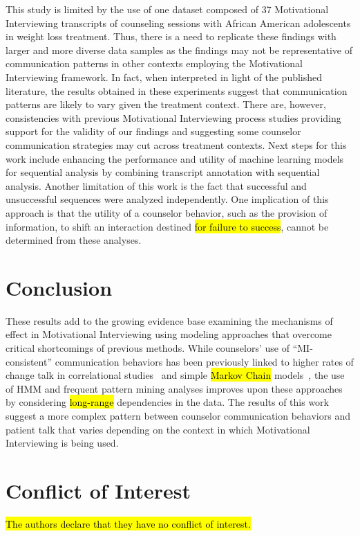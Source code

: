 \documentclass[smallextended]{svjour3}       %
\begin{document}
This study is limited by the use of one dataset composed of 37 Motivational Interviewing transcripts of counseling sessions with African American adolescents in weight loss treatment. Thus, there is a need to replicate these findings with larger and more diverse data samples as the findings may not be representative of communication patterns in other contexts employing the Motivational Interviewing framework. In fact, when interpreted in light of the published literature, the results obtained in these experiments suggest that communication patterns are likely to vary given the treatment context. There are, however, consistencies with previous Motivational Interviewing process studies providing support for the validity of our findings and suggesting some counselor communication strategies may cut across treatment contexts. Next steps for this work include enhancing the performance and utility of machine learning models for sequential analysis by combining transcript annotation with sequential analysis. Another limitation of this work is the fact that successful and unsuccessful sequences were analyzed independently. One implication of this approach is that the utility of a counselor behavior, such as the provision of information, to shift an interaction destined \hl{for failure to success}, cannot be determined from these analyses.

\section{Conclusion}
\label{sec:conclusion}
These results add to the growing evidence base examining the mechanisms of effect in Motivational Interviewing using modeling approaches that overcome critical shortcomings of previous methods. While counselors' use of ``MI-consistent'' communication behaviors has been previously linked to higher rates of change talk in correlational studies~\cite{moyers2006therapist, catley2006adherence, thrasher2006motivational, mccambridge2011fidelity} and simple \hl{Markov Chain} models~\cite{moyers2006therapist, moyers2009session, gaume2010counselor}, the use of HMM and frequent pattern mining analyses improves upon these approaches by considering \hl{long-range} dependencies in the data. The results of this work suggest a more complex pattern between counselor communication behaviors and patient talk that varies depending on the context in which Motivational Interviewing is being used.  

\section{Conflict of Interest}
\label{sec:conflictofInterest}
\hl{The authors declare that they have no conflict of interest.}
\end{document}
